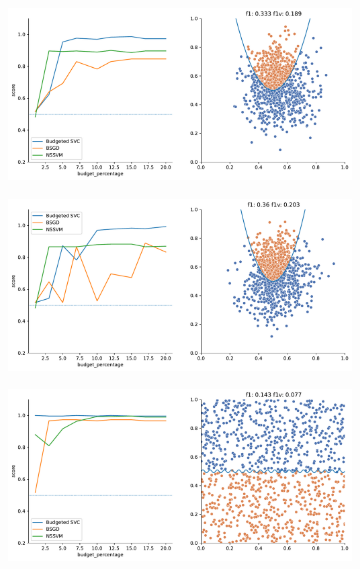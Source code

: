 \begin{figure}
\begin{subfigure}{.5\textwidth}
    \end{subfigure}
    \begin{subfigure}{.5\textwidth}
        \centering
        \includegraphics[width=\textwidth]{img/comp_new/4.pdf}
    \end{subfigure}%
    \hfill
    \begin{subfigure}{.5\textwidth}
        \centering
        \includegraphics[width=\textwidth]{img/comp_new/5.pdf}
    \end{subfigure}
    \begin{subfigure}{.5\textwidth}
        \centering
        \includegraphics[width=\textwidth]{img/comp_new/6.pdf}

\end{subfigure}
\end{figure}
